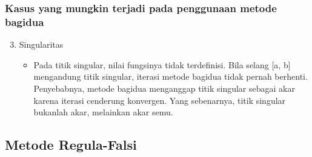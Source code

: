 \documentclass[pdflatex,compress]{beamer}
\begin{document}
\begin{frame}
	\frametitle{Kasus yang mungkin terjadi pada penggunaan metode bagidua}
	\begin{enumerate}
		\setcounter{enumi}{2}
		\item Singularitas
		\begin{itemize}
			\item Pada titik singular, nilai fungsinya tidak terdefinisi. Bila selang [a, b] mengandung titik singular, iterasi metode bagidua tidak pernah berhenti. Penyebabnya, metode bagidua menganggap titik singular sebagai akar karena iterasi cenderung konvergen. Yang sebenarnya, titik singular bukanlah akar, melainkan akar semu.
		\end{itemize}
	\end{enumerate}
\end{frame}

\subsection{Metode Regula-Falsi}
\end{document}
